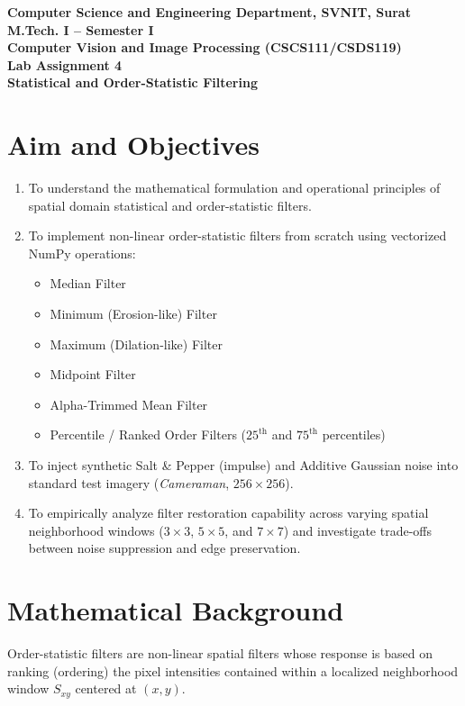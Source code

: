 \documentclass[12pt]{article}
\begin{document}

\begin{center}
\textbf{Computer Science and Engineering Department, SVNIT, Surat}\\
\textbf{M.Tech. I -- Semester I}\\
\textbf{Computer Vision and Image Processing (CSCS111/CSDS119)}\\
\textbf{Lab Assignment 4}\\
\textbf{Statistical and Order-Statistic Filtering}
\end{center}

\vspace{0.3cm}

\section{Aim and Objectives}
\begin{enumerate}
    \item To understand the mathematical formulation and operational principles of spatial domain statistical and order-statistic filters.
    \item To implement non-linear order-statistic filters from scratch using vectorized NumPy operations:
    \begin{itemize}
        \item Median Filter
        \item Minimum (Erosion-like) Filter
        \item Maximum (Dilation-like) Filter
        \item Midpoint Filter
        \item Alpha-Trimmed Mean Filter
        \item Percentile / Ranked Order Filters ($25^{\text{th}}$ and $75^{\text{th}}$ percentiles)
    \end{itemize}
    \item To inject synthetic Salt \& Pepper (impulse) and Additive Gaussian noise into standard test imagery (\textit{Cameraman}, $256 \times 256$).
    \item To empirically analyze filter restoration capability across varying spatial neighborhood windows ($3 \times 3$, $5 \times 5$, and $7 \times 7$) and investigate trade-offs between noise suppression and edge preservation.
\end{enumerate}

\section{Mathematical Background}
Order-statistic filters are non-linear spatial filters whose response is based on ranking (ordering) the pixel intensities contained within a localized neighborhood window $S_{xy}$ centered at $(x, y)$.
\end{document}

